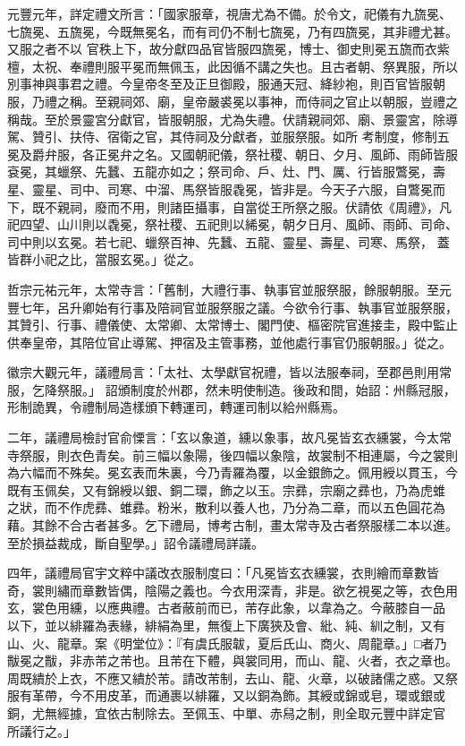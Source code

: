 \begin{pinyinscope}
 元豐元年，詳定禮文所言：「國家服章，視唐尤為不備。於令文，祀儀有九旒冕、七旒冕、五旒冕，今既無冕名，而有司仍不制七旒冕，乃有四旒冕，其非禮尤甚。又服之者不以
 官秩上下，故分獻四品官皆服四旒冕，博士、御史則冕五旒而衣紫檀，太祝、奉禮則服平冕而無佩玉，此因循不講之失也。且古者朝、祭異服，所以別事神與事君之禮。今皇帝冬至及正旦御殿，服通天冠、絳紗袍，則百官皆服朝服，乃禮之稱。至親祠郊、廟，皇帝嚴裘冕以事神，而侍祠之官止以朝服，豈禮之稱哉。至於景靈宮分獻官，皆服朝服，尤為失禮。伏請親祠郊、廟、景靈宮，除導駕、贊引、扶侍、宿衛之官，其侍祠及分獻者，並服祭服。如所
 考制度，修制五冕及爵弁服，各正冕弁之名。又國朝祀儀，祭社稷、朝日、夕月、風師、雨師皆服袞冕，其蠟祭、先蠶、五龍亦如之；祭司命、戶、灶、門、厲、行皆服鷩冕，壽星、靈星、司中、司寒、中溜、馬祭皆服毳冕，皆非是。今天子六服，自鷩冕而下，既不親祠，廢而不用，則諸臣攝事，自當從王所祭之服。伏請依《周禮》，凡祀四望、山川則以毳冕，祭社稷、五祀則以絺冕，朝夕日月、風師、雨師、司命、司中則以玄冕。若七祀、蠟祭百神、先蠶、五龍、靈星、壽星、司寒、馬祭，
 蓋皆群小祀之比，當服玄冕。」從之。



 哲宗元祐元年，太常寺言：「舊制，大禮行事、執事官並服祭服，餘服朝服。至元豐七年，呂升卿始有行事及陪祠官並服祭服之議。今欲令行事、執事官並服祭服，其贊引、行事、禮儀使、太常卿、太常博士、閣門使、樞密院官進接圭，殿中監止供奉皇帝，其陪位官止導駕、押宿及主管事務，並他處行事官仍服朝服。」從之。



 徽宗大觀元年，議禮局言：「太社、太學獻官祝禮，皆以法服奉祠，至郡邑則用常服，乞降祭服。」
 詔頒制度於州郡，然未明使制造。後政和間，始詔：州縣冠服，形制詭異，令禮制局造樣頒下轉運司，轉運司制以給州縣焉。



 二年，議禮局檢討官俞慄言：「玄以象道，纁以象事，故凡冕皆玄衣纁裳，今太常寺祭服，則衣色青矣。前三幅以象陽，後四幅以象陰，故裳制不相連屬，今之裳則為六幅而不殊矣。冕玄表而朱裏，今乃青羅為覆，以金銀飾之。佩用綬以貫玉，今既有玉佩矣，又有錦綬以銀、銅二環，飾之以玉。宗彞，宗廟之彞也，乃為虎蜼
 之狀，而不作虎彞、蜼彞。粉米，散利以養人也，乃分為二章，而以五色圓花為藉。其餘不合古者甚多。乞下禮局，博考古制，畫太常寺及古者祭服樣二本以進。至於損益裁成，斷自聖學。」詔令議禮局詳議。



 四年，議禮局官宇文粹中議改衣服制度曰：「凡冕皆玄衣纁裳，衣則繪而章數皆奇，裳則繡而章數皆偶，陰陽之義也。今衣用深青，非是。欲乞視冕之等，衣色用玄，裳色用纁，以應典禮。古者蔽前而已，芾存此象，以韋為之。今蔽膝自一品
 以下，並以緋羅為表緣，緋絹為里，無復上下廣狹及會、紕、純、紃之制，又有山、火、龍章。案《明堂位》：『有虞氏服韍，夏后氏山、商火、周龍章。」□者乃黻冕之黻，非赤芾之芾也。且芾在下體，與裳同用，而山、龍、火者，衣之章也。周既繢於上衣，不應又繢於芾。請改芾制，去山、龍、火章，以破諸儒之惑。又祭服有革帶，今不用皮革，而通裹以緋羅，又以銅為飾。其綬或錦或皂，環或銀或銅，尤無經據，宜依古制除去。至佩玉、中單、赤舄之制，則全取元豐中詳定官
 所議行之。」




\end{pinyinscope}
